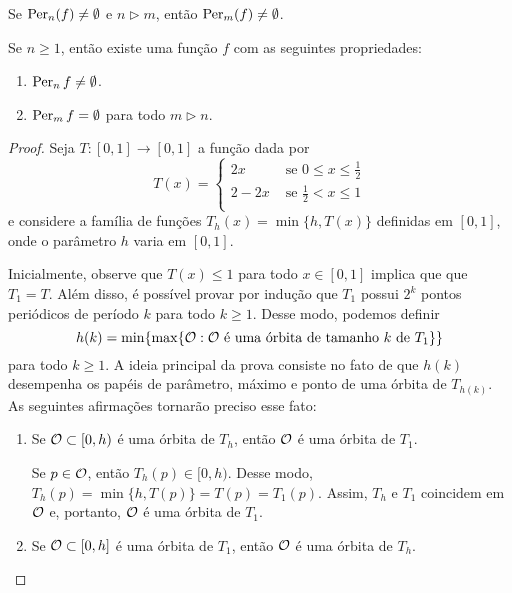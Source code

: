 \begin{theorem}[Sharkovsky]
Se $\operatorname{Per}_n(f) \neq \emptyset$ e $n \triangleright m$, então $\operatorname{Per}_m(f) \neq \emptyset$.
\end{theorem}

\begin{theorem}
Se $n \geq 1$, então existe uma função $f$ com as seguintes propriedades:
\begin{enumerate}
\item $\operatorname{Per}_n{f} \neq \emptyset$.
\item $\operatorname{Per}_m{f} =  \emptyset$ para todo $m \triangleright n$.
\end{enumerate}
\end{theorem}

\begin{proof}
Seja $T: [0,1] \to [0,1]$ a função dada por 
\[ T(x) =
  \begin{cases}
    2x & \text{ se } 0 \leq x \leq \frac{1}{2} \\
    2 - 2x & \text{ se } \frac{1}{2} < x \leq 1 \\
  \end{cases}
\]
e considere a família de funções $T_h(x) = \min \lbrace h, T(x) \rbrace$ definidas em $[0,1]$, onde o parâmetro $h$ varia em $[0,1]$.

Inicialmente, observe que $T(x) \leq 1$ para todo $x \in [0,1]$ implica que que $T_1 = T$.
Além disso, é possível provar por indução que $T_1$ possui $2^k$ pontos periódicos de período $k$ para todo $k \geq 1$.
Desse modo, podemos definir
$$h(k) = \min \lbrace \max \lbrace \mathcal{O} : \mathcal{O} \text{ é uma órbita de tamanho } k \text{ de } T_1 \rbrace \rbrace$$
para todo $k \geq 1$.
A ideia principal da prova consiste no fato de que $h(k)$ desempenha os papéis de parâmetro, máximo e ponto de uma órbita de $T_{h(k)}$. As seguintes afirmações tornarão preciso esse fato:

\begin{enumerate}[label=\alph*)]
\item Se $\mathcal{O} \subset [0, h)$ é uma órbita de $T_h$, então $\mathcal{O}$ é uma órbita de $T_1$.

Se $p \in \mathcal{O}$, então $T_h(p) \in [0, h)$.
Desse modo, $T_h(p) = \min \{h, T(p)\} = T(p) = T_1(p)$.
Assim, $T_h$ e $T_1$ coincidem em $\mathcal{O}$ e, portanto, $\mathcal{O}$ é uma órbita de $T_1$.

\item Se $\mathcal{O} \subset [0, h]$ é uma órbita de $T_1$, então $\mathcal{O}$ é uma órbita de $T_h$.


\end{enumerate}
\end{proof}
